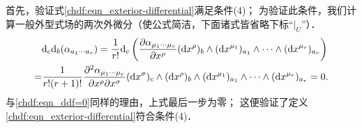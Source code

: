 首先，验证式\eqref{chdf:eqn_exterior-differential}满足条件(4)；
为验证此条件，我们计算一般外型式场的两次外微分（使公式简洁，下面诸式皆省略下标“$|_U$”）．
\begin{align*}
    & {\rm d}_{c}{\rm d}_{b}(\alpha_{a_1\cdots a_r})
    = \frac{1}{r!} {\rm d}_{c}\left(\frac{\partial \alpha_{\mu_{1}\cdots \mu_{r}}}{\partial x^\rho}
    ({\rm d}x^\rho)_{b} \wedge
    ({\rm d}x^{\mu_1})_{a_{1}} \wedge\cdots\wedge ({\rm d}x^{\mu_r})_{a_{r}}  \right) \\
    =& \frac{1}{r!(r+1)!}
    \frac{\partial^2 \alpha_{\mu_{1}\cdots \mu_{r}}}{\partial x^\rho \partial x^\sigma}
    ({\rm d}x^\sigma)_{c} \wedge ({\rm d}x^\rho)_{b} \wedge
    ({\rm d}x^{\mu_1})_{a_{1}} \wedge\cdots\wedge ({\rm d}x^{\mu_r})_{a_{r}}  =0.
\end{align*}
与\eqref{chdf:eqn_ddf=0}同样的理由，上式最后一步为零；
这便验证了定义\eqref{chdf:eqn_exterior-differential}符合条件(4)．


